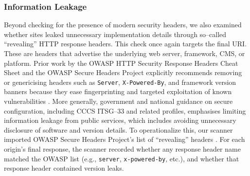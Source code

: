 \documentclass[pdflatex,sn-mathphys-num]{sn-jnl}
\numberwithin{equation}{section}
\theoremstyle{thmstyleone}
\theoremstyle{thmstyletwo}%
\theoremstyle{thmstylethree}%
\begin{document}
\subsubsection{Information Leakage}

\vspace{1em}Beyond checking for the presence of modern security headers, we also examined whether sites leaked 
unnecessary implementation details through so--called 
``revealing'' HTTP response headers. This check once again targets the final URI. 
These are headers that advertise the underlying web server, framework, CMS, or platform. Prior work by the OWASP 
HTTP Security Response Headers
Cheat Sheet and the OWASP Secure Headers Project explicitly recommends removing or genericising headers such as 
\texttt{Server}, \texttt{X-Powered-By}, 
and framework version banners because they ease fingerprinting and targeted exploitation of known vulnerabilities 
\cite{owasp_secure_headers_project, owasp_http_security_response_headers}. 
More generally, government and national guidance on secure configuration, including CCCS ITSG--33 and related profiles, emphasises limiting information leakage from public services, 
which includes avoiding unnecessary disclosure of software and version details. To operationalize this, our scanner 
imported OWASP Secure Headers Project's list of ``revealing'' headers \cite{owasp_secure_headers_remove_json}. 
For each origin's final response, the scanner recorded whether any response header name matched the OWASP list 
(e.g., \texttt{server}, \texttt{x-powered-by}, etc.), and whether that response header contained version leaks.

\end{document}
